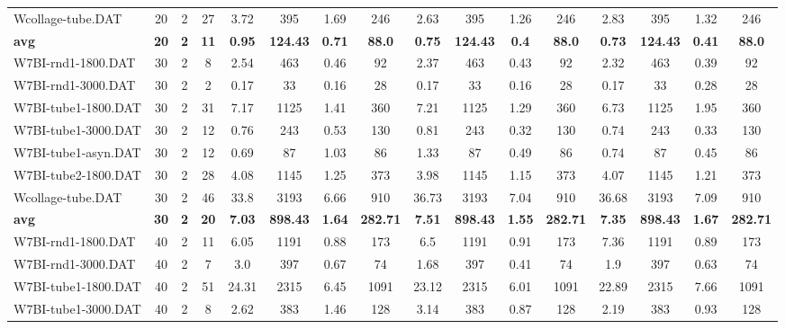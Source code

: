 \begin{sidewaystable}[!ht]
{\begin{tabular}{lccccccccccccccc}
Wcollage-tube.DAT & 20 & 2 & 27 & 3.72 & 395 & 1.69 & 246 & 2.63 & 395 &  \textcolor{blue2}{1.26} & 246 & 2.83 & 395 & 1.32 & 246 \\
\cline{1-16} \textbf{avg} & \textbf{20} & \textbf{2} & \textbf{11} & \textbf{0.95} & \textbf{124.43} & \textbf{0.71} & \textbf{88.0} & \textbf{0.75} & \textbf{124.43} & \textbf{0.4} & \textbf{88.0} & \textbf{0.73} & \textbf{124.43} & \textbf{0.41} & \textbf{88.0} \\ \cline{1-16}
W7BI-rnd1-1800.DAT & 30 & 2 & 8 & 2.54 & 463 & 0.46 & 92 & 2.37 & 463 & 0.43 & 92 & 2.32 & 463 &  \textcolor{blue2}{0.39} & 92 \\
W7BI-rnd1-3000.DAT & 30 & 2 & 2 & 0.17 & 33 &  \textcolor{blue2}{0.16} & 28 & 0.17 & 33 &  \textcolor{blue2}{0.16} & 28 & 0.17 & 33 & 0.28 & 28 \\
W7BI-tube1-1800.DAT & 30 & 2 & 31 & 7.17 & 1125 & 1.41 & 360 & 7.21 & 1125 &  \textcolor{blue2}{1.29} & 360 & 6.73 & 1125 & 1.95 & 360 \\
W7BI-tube1-3000.DAT & 30 & 2 & 12 & 0.76 & 243 & 0.53 & 130 & 0.81 & 243 &  \textcolor{blue2}{0.32} & 130 & 0.74 & 243 & 0.33 & 130 \\
W7BI-tube1-asyn.DAT & 30 & 2 & 12 & 0.69 & 87 & 1.03 & 86 & 1.33 & 87 & 0.49 & 86 & 0.74 & 87 &  \textcolor{blue2}{0.45} & 86 \\
W7BI-tube2-1800.DAT & 30 & 2 & 28 & 4.08 & 1145 & 1.25 & 373 & 3.98 & 1145 &  \textcolor{blue2}{1.15} & 373 & 4.07 & 1145 & 1.21 & 373 \\
Wcollage-tube.DAT & 30 & 2 & 46 & 33.8 & 3193 &  \textcolor{blue2}{6.66} & 910 & 36.73 & 3193 & 7.04 & 910 & 36.68 & 3193 & 7.09 & 910 \\
\cline{1-16} \textbf{avg} & \textbf{30} & \textbf{2} & \textbf{20} & \textbf{7.03} & \textbf{898.43} & \textbf{1.64} & \textbf{282.71} & \textbf{7.51} & \textbf{898.43} & \textbf{1.55} & \textbf{282.71} & \textbf{7.35} & \textbf{898.43} & \textbf{1.67} & \textbf{282.71} \\ \cline{1-16}
W7BI-rnd1-1800.DAT & 40 & 2 & 11 & 6.05 & 1191 &  \textcolor{blue2}{0.88} & 173 & 6.5 & 1191 & 0.91 & 173 & 7.36 & 1191 & 0.89 & 173 \\
W7BI-rnd1-3000.DAT & 40 & 2 & 7 & 3.0 & 397 & 0.67 & 74 & 1.68 & 397 &  \textcolor{blue2}{0.41} & 74 & 1.9 & 397 & 0.63 & 74 \\
W7BI-tube1-1800.DAT & 40 & 2 & 51 & 24.31 & 2315 & 6.45 & 1091 & 23.12 & 2315 &  \textcolor{blue2}{6.01} & 1091 & 22.89 & 2315 & 7.66 & 1091 \\
W7BI-tube1-3000.DAT & 40 & 2 & 8 & 2.62 & 383 & 1.46 & 128 & 3.14 & 383 &  \textcolor{blue2}{0.87} & 128 & 2.19 & 383 & 0.93 & 128 \\

\end{tabular}}
\end{sidewaystable}
